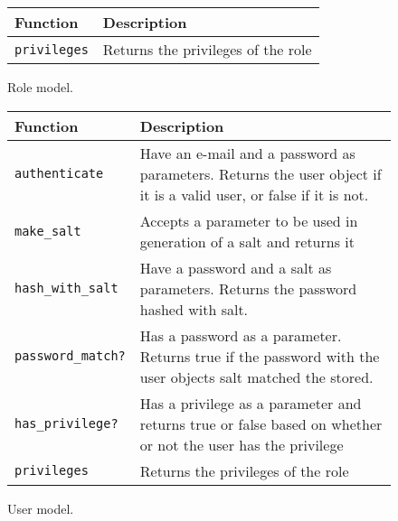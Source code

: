 \begin{figure}[htb]
\begin{center}
\begin{tabular}{ | l | p{8cm} | }
  \hline
    \textbf{Function} & \textbf{Description} \\ \hline
    \verb+privileges+ & Returns the privileges of the role \\ \hline
\end{tabular}
\caption{Role model.}
\label{tab:role_model_functions}
\end{center}
\end{figure}

\begin{figure}[htb]
\begin{center}
\begin{tabular}{ | l | p{8cm} | }
  \hline
    \textbf{Function} & \textbf{Description} \\ \hline
    \verb+authenticate+ & Have an e-mail and a password as parameters. Returns the user object if it is a valid user, or false if it is not. \\ \hline
    \verb+make_salt+ & Accepts a parameter to be used in generation of a salt and returns it \\ \hline
    \verb+hash_with_salt+ & Have a password and a salt as parameters. Returns the password hashed with salt.  \\ \hline
    \verb+password_match?+ & Has a password as a parameter. Returns true if the password with the user objects salt matched the stored. \\ \hline
    \verb+has_privilege?+ & Has a privilege as a parameter and returns true or false based on whether or not the user has the privilege \\ \hline
    \verb+privileges+ & Returns the privileges of the role \\ \hline
\end{tabular}
\caption{User model.}
\label{tab:user_model_functions}
\end{center}
\end{figure}
